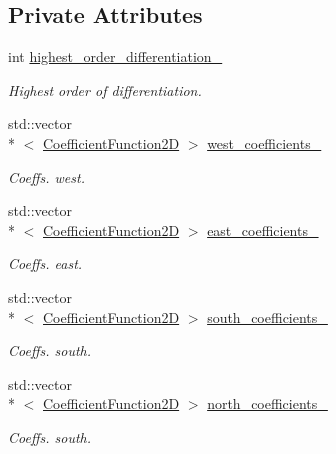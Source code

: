 \subsection*{Private Attributes}
\begin{DoxyCompactItemize}
\item 
int \hyperlink{classmtk_1_1BCDescriptor2D_af6dad4b8fe09597f25a710b1aec40a48}{highest\+\_\+order\+\_\+differentiation\+\_\+}
\begin{DoxyCompactList}\small\item\em Highest order of differentiation. \end{DoxyCompactList}\item 
std\+::vector\\*
$<$ \hyperlink{group__c07-mim__ops_ga0322dd5a158c1864242833ec224ee4c1}{Coefficient\+Function2\+D} $>$ \hyperlink{classmtk_1_1BCDescriptor2D_a7df71b43acc25c468683075cc7790bb2}{west\+\_\+coefficients\+\_\+}
\begin{DoxyCompactList}\small\item\em Coeffs. west. \end{DoxyCompactList}\item 
std\+::vector\\*
$<$ \hyperlink{group__c07-mim__ops_ga0322dd5a158c1864242833ec224ee4c1}{Coefficient\+Function2\+D} $>$ \hyperlink{classmtk_1_1BCDescriptor2D_a1f90fc303984bf18c136a34896bbb7c9}{east\+\_\+coefficients\+\_\+}
\begin{DoxyCompactList}\small\item\em Coeffs. east. \end{DoxyCompactList}\item 
std\+::vector\\*
$<$ \hyperlink{group__c07-mim__ops_ga0322dd5a158c1864242833ec224ee4c1}{Coefficient\+Function2\+D} $>$ \hyperlink{classmtk_1_1BCDescriptor2D_a263309b9ad288dc89826d818d9378d07}{south\+\_\+coefficients\+\_\+}
\begin{DoxyCompactList}\small\item\em Coeffs. south. \end{DoxyCompactList}\item 
std\+::vector\\*
$<$ \hyperlink{group__c07-mim__ops_ga0322dd5a158c1864242833ec224ee4c1}{Coefficient\+Function2\+D} $>$ \hyperlink{classmtk_1_1BCDescriptor2D_a5429c040c034303dd92dcff554f9efad}{north\+\_\+coefficients\+\_\+}
\begin{DoxyCompactList}\small\item\em Coeffs. south. \end{DoxyCompactList}\item 

\end{DoxyCompactItemize}
